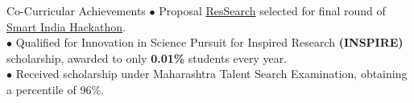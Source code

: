 \documentclass{resume} %
\begin{document}

\begin{rSection}{Co-Curricular Achievements}
$\bullet$ Proposal \href{https://docs.google.com/presentation/d/1ndJbIQCxFEf__I55yOOME-a_UGWDv1KMlukVE2lbDeA/}{ResSearch} selected for final round of \href{https://drive.google.com/open?id=0B5iU6cWw36rOamZLWHZENWdlY0k}{Smart India Hackathon}. \\
$\bullet$ Qualified for Innovation in Science Pursuit for Inspired Research {\bf \large (INSPIRE)} scholarship, awarded to only \textbf{0.01\%} students every year. \\
$\bullet$ Received scholarship under Maharashtra Talent Search Examination, obtaining a percentile of 96\%.
\end{rSection}


\end{document}

